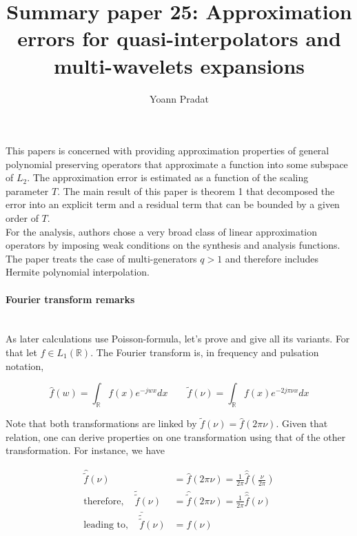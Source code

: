 \documentclass[a4paper, 11pt]{article}
\begin{document}
\title{Summary paper 25: Approximation errors for quasi-interpolators and multi-wavelets expansions}
\author{Yoann Pradat}
\maketitle

This papers is concerned with providing approximation properties of general polynomial preserving operators that 
approximate a function into some subspace of $L_2$. The approximation error is estimated as a function of the scaling 
parameter $T$. The main result of this paper is theorem 1 that decomposed the error into an explicit term and a residual 
term that can be bounded by a given order of $T$. \\

For the analysis, authors chose a very broad class of linear approximation operators by imposing weak conditions on the 
synthesis and analysis functions. The paper treats the case of multi-generators $q > 1$ and therefore includes Hermite 
polynomial interpolation. 

\paragraph{Fourier transform remarks} \mbox{} \\

As later calculations use Poisson-formula, let's prove and give all its variants. For that let $f \in L_1(\mathbb{R})$.  
The Fourier transform is, in frequency and pulsation notation,

\begin{equation*}
  \hat{f}(w) = \int_{\mathbb{R}} f(x) e^{-jwx}dx \qquad \tilde{f}(\nu) = \int_{\mathbb{R}} f(x) e^{-2j\pi \nu x}dx
\end{equation*}

Note that both transformations are linked by $\tilde{f}(\nu) = \hat{f}(2\pi \nu)$. Given that relation, one can derive 
properties on one transformation using that of the other transformation. For instance, we have

\begin{align*}
  \hat{\tilde{f}}(\nu) &= \widehat{\hat{f}(2\pi \nu)} = \frac{1}{2\pi} \hat{\hat{f}}(\frac{\nu}{2\pi}) \\
  \text{therefore}, \quad \tilde{\tilde{f}}(\nu) &= \hat{\tilde{f}}(2\pi\nu) = \frac{1}{2\pi} \hat{\hat{f}}(\nu) \\
  \text{leading to}, \quad \bar{\tilde{\tilde{f}}}(\nu) &= f(\nu)
\end{align*}
\end{document}
